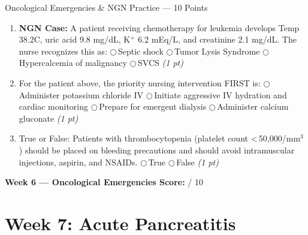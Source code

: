 \documentclass[11pt,letterpaper]{article}
\newcommand{\blank}[1][3cm]{\underline{\hspace{#1}}}
\begin{document}
\begin{diagbox}{Oncological Emergencies \& NGN Practice --- 10 Points}
\begin{enumerate}[leftmargin=1.5em, label=\textbf{\arabic*.},start=11]
  \item \textbf{NGN Case:} A patient receiving chemotherapy for leukemia develops Temp 38.2\textdegree C,
        uric acid 9.8 mg/dL, K$^+$ 6.2 mEq/L, and creatinine 2.1 mg/dL.
        The nurse recognizes this as:
        $\bigcirc$\,Septic shock
        $\bigcirc$\,Tumor Lysis Syndrome
        $\bigcirc$\,Hypercalcemia of malignancy
        $\bigcirc$\,SVCS
        \hfill\textit{(1 pt)}

  \item For the patient above, the priority nursing intervention FIRST is:
        $\bigcirc$\,Administer potassium chloride IV
        $\bigcirc$\,Initiate aggressive IV hydration and cardiac monitoring
        $\bigcirc$\,Prepare for emergent dialysis
        $\bigcirc$\,Administer calcium gluconate
        \hfill\textit{(1 pt)}

  \item True or False: Patients with thrombocytopenia (platelet count \textless\,50{,}000/mm$^3$)
        should be placed on bleeding precautions and should avoid intramuscular injections,
        aspirin, and NSAIDs.
        \quad$\bigcirc$\,True \quad$\bigcirc$\,False
        \hfill\textit{(1 pt)}

\end{enumerate}

\vspace{0.3cm}
\textbf{Week 6 --- Oncological Emergencies Score:} \blank[1cm] / 10
\end{diagbox}

\newpage


\section{Week 7: Acute Pancreatitis}
\end{document}
